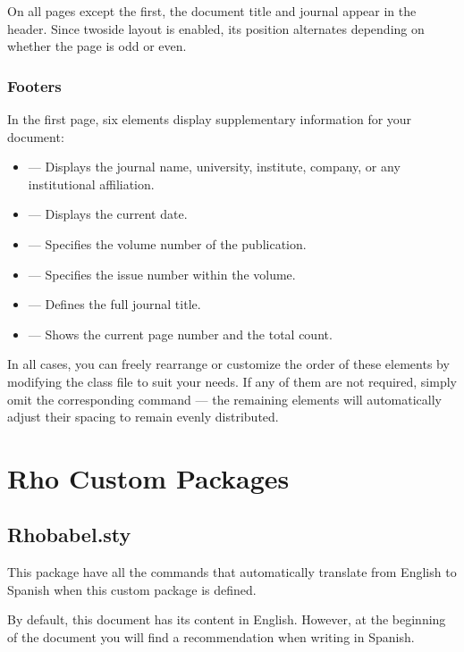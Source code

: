 \documentclass[9pt,a4paper,twocolumn,twoside]{rho-class/rho}
\begin{document}
            On all pages except the first, the document title and journal appear in the header. Since twoside layout is enabled, its position alternates depending on whether the page is odd or even.

        \subsubsection{Footers}

            In the first page, six elements display supplementary information for your document:

            \begin{itemize}
                \item \inlinecode{\journalname{}} — Displays the journal name, university, institute, company, or any institutional affiliation.
                \item \inlinecode{\theday{}} — Displays the current date.
                \item \inlinecode{\vol{}} — Specifies the volume number of the publication.
                \item \inlinecode{\no{}} — Specifies the issue number within the volume.
                \item \inlinecode{\journal{}} — Defines the full journal title.
                \item \inlinecode{\thepage} — Shows the current page number and the total count.
            \end{itemize}

             In all cases, you can freely rearrange or customize the order of these elements by modifying the class file to suit your needs. If any of them are not required, simply omit the corresponding command — the remaining elements will automatically adjust their spacing to remain evenly distributed.

\section{Rho Custom Packages}

    \subsection{Rhobabel.sty}
		
		This package have all the commands that automatically translate from English to Spanish when this custom package is defined. 
		
		By default, this document has its content in English. However, at the beginning of the document you will find a recommendation when writing in Spanish. 
		
\end{document}

